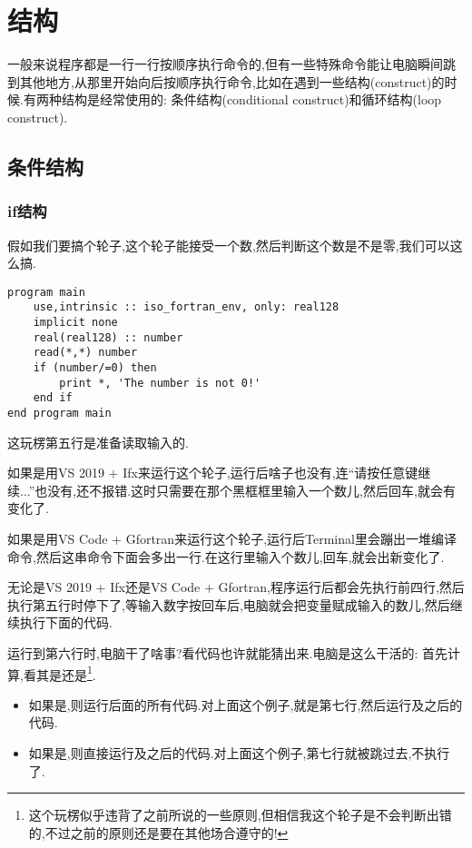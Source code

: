\chapter{结构}\label{fortran_construct}

一般来说程序都是一行一行按顺序执行命令的,但有一些特殊命令能让电脑瞬间跳到其他地方,从那里开始向后按顺序执行命令,比如在遇到一些结构(construct)的时候.有两种结构是经常使用的: 条件结构(conditional construct)和循环结构(loop construct).

\section{条件结构}

\subsection{if结构}\label{if_construct}

假如我们要搞个轮子,这个轮子能接受一个数,然后判断这个数是不是零,我们可以这么搞.
\begin{lstlisting}
program main
    use,intrinsic :: iso_fortran_env, only: real128
    implicit none
    real(real128) :: number
    read(*,*) number
    if (number/=0) then
        print *, 'The number is not 0!'
    end if
end program main
\end{lstlisting}

这玩楞第五行是准备读取输入的.

如果是用VS 2019 + Ifx来运行这个轮子,运行后啥子也没有,连``请按任意键继续...''也没有,还不报错.这时只需要在那个黑框框里输入一个数儿,然后回车,就会有变化了.

如果是用VS Code + Gfortran来运行这个轮子,运行后Terminal里会蹦出一堆编译命令,然后这串命令下面会多出一行.在这行里输入个数儿,回车,就会出新变化了.

无论是VS 2019 + Ifx还是VS Code + Gfortran,程序运行后都会先执行前四行,然后执行第五行时停下了,等输入数字按回车后,电脑就会把变量赋成输入的数儿,然后继续执行下面的代码.

运行到第六行时,电脑干了啥事?看代码也许就能猜出来.电脑是这么干活的: 首先计算,看其是还是\footnote{
    这个玩楞似乎违背了之前所说的一些原则,但相信我这个轮子是不会判断出错的,不过之前的原则还是要在其他场合遵守的!
}.
\begin{itemize}
    \item 如果是,则运行后面的所有代码.对上面这个例子,就是第七行,然后运行及之后的代码.
    \item 如果是,则直接运行及之后的代码.对上面这个例子,第七行就被跳过去,不执行了.
\end{itemize}

